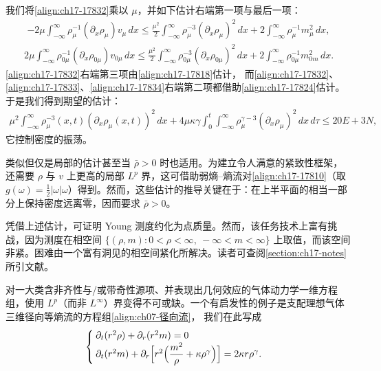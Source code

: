 \documentclass[../../main.tex]{subfiles}
\begin{document}
我们将\eqref{align:ch17-17832}乘以 $\mu$，并如下估计右端第一项与最后一项：
\begin{align}
-2\mu\int_{-\infty}^\infty\rho_\mu^{-1}(\partial_x\rho_\mu)v_\mu\,dx\leqslant\frac{\mu^2}{2}\int_{-\infty}^\infty\rho_\mu^{-3}(\partial_x\rho_\mu)^2\,dx+2\int_{-\infty}^\infty\rho_\mu^{-1}m_\mu^2\,dx,
\label{align:ch17-17833}
\end{align}
\begin{align}
2\mu\int_{-\infty}^\infty\rho_{0\mu}^{-1}(\partial_x\rho_{0\mu})v_{0\mu}\,dx\leqslant\frac{\mu^2}{2}\int_{-\infty}^\infty\rho_{0\mu}^{-3}(\partial_x\rho_{0\mu})^2\,dx+2\int_{-\infty}^\infty\rho_{0\mu}^{-1}m_{0m}^2\,dx.
\label{align:ch17-17834}
\end{align}
\eqref{align:ch17-17832}右端第三项由\eqref{align:ch17-17818}估计，%
而\eqref{align:ch17-17832}、\eqref{align:ch17-17833}、\eqref{align:ch17-17834}右端第二项都借助\eqref{align:ch17-17824}估计。于是我们得到期望的估计：
\begin{align}
\mu^2\int_{-\infty}^\infty\rho_\mu^{-3}(x,t)(\partial_x\rho_\mu(x,t))^2\,dx+4\mu\kappa\gamma\int_0^t\int_{-\infty}^\infty\rho_\mu^{\gamma-3}(\partial_x\rho_\mu)^2\,dx\,d\tau\leqslant20E+3N,
\label{align:ch17-17835}
\end{align}
它控制密度的振荡。

类似但仅是局部的估计甚至当 $\bar\rho>0$ 时也适用。为建立令人满意的紧致性框架，还需要 $\rho$ 与 $v$ 上更高的局部 $L^p$ 界，这可借助弱熵--熵流对\eqref{align:ch17-17810}（取 $g(\omega)=\frac{1}{2}|\omega|\omega$）得到。然而，这些估计的推导关键在于：在上半平面的相当一部分上保持密度远离零，因而要求 $\bar\rho>0$。

凭借上述估计，可证明 Young 测度约化为点质量。然而，该任务技术上富有挑战，因为测度在相空间 $\{(\rho,m):0<\rho<\infty,\ -\infty<m<\infty\}$ 上取值，而该空间非紧。困难由一个富有洞见的相空间紧化所解决。读者可查阅\cref{section:ch17-notes}所引文献。

对一大类含非齐性与/或带奇性源项、并表现出几何效应的气体动力学一维方程组，使用 $L^p$（而非 $L^\infty$）界变得不可或缺。一个有启发性的例子是支配理想气体三维径向等熵流的方程组\eqref{align:ch07-径向流}，
我们在此写成
\begin{align}
\begin{cases}
\partial_t(r^2\rho)+\partial_r(r^2m)=0\\
\partial_t(r^2m)+\partial_r\Bigl[r^2\Bigl(\dfrac{m^2}{\rho}+\kappa\rho^\gamma\Bigr)\Bigr]=2\kappa r\rho^\gamma.
\end{cases}
\label{align:ch17-17836}
\end{align}
\end{document}
